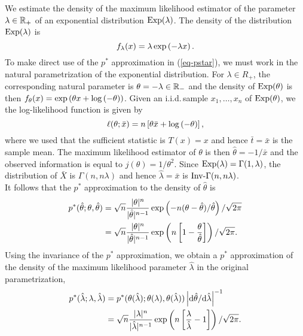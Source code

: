 \begin{example}
    We estimate the density of the maximum likelihood estimator of the parameter $\lambda \in \mathbb{R}_+$ of an exponential distribution ${\textrm{Exp}}(\lambda)$. The density of the distribution ${\textrm{Exp}}(\lambda)$ is
    \begin{equation*}
        f_\lambda(x) = \lambda \exp\left(-\lambda x\right).
    \end{equation*}
    To make direct use of the $p^*$ approximation in (\ref{eq-pstar}), we must work in the natural parametrization of the exponential distribution. For $\lambda \in R_+$, the corresponding natural parameter is $\theta = -\lambda \in \mathbb{R}_-$ and the density of ${\textrm{Exp}}(\theta)$ is then $f_\theta(x) = \exp\left( \theta x + \log\left(-\theta\right)\right)$. Given an i.i.d.\,sample $x_1, \ldots, x_n$ of ${\textrm{Exp}}(\theta)$, we the log-likelihood function is given by 
    \begin{equation*}
        \ell(\theta; \bar x) = n\left[\theta \bar x + \log\left(-\theta\right)\right],
    \end{equation*}
    where we used that the sufficient statistic is $T(x) = x$ and hence $\bar t = \bar x$ is the sample mean. The maximum likelihood estimator of $\theta$ is then $\hat\theta = -1/\bar x$ and the observed information is equal to $j(\theta) = 1/\theta^2$. Since ${\textrm{Exp}}(\lambda) = \Gamma(1, \lambda)$, the distribution of $\bar X$ is $\Gamma(n, n\lambda)$ and hence $\hat\lambda = \bar x$ is ${\textrm{Inv-}}\Gamma(n, n\lambda)$. 
    \\
    It follows that the $p^*$ approximation to the density of $\hat\theta$ is
    \begin{align*}
        p^*(\hat\theta; \theta, \hat\theta) 
        &= \sqrt{n} \frac{|\theta|^n}{|\hat\theta|^{n-1}}\exp\left(-n(\theta - \hat\theta)/\hat\theta\right) / \sqrt{2\pi}\\
        &= \sqrt{n} \frac{|\theta|^n}{|\hat\theta|^{n-1}}\exp\left(n\left[1 - \frac{\theta}{\hat\theta}\right]\right) / \sqrt{2\pi}.
    \end{align*}
    Using the invariance of the $p^*$ approximation, we obtain a $p^*$ approximation of the density of the maximum likelihood parameter $\hat\lambda$ in the original parametrization,
    \begin{align}
        p^*(\hat\lambda; \lambda, \hat\lambda) 
        &= p^*(\theta(\hat\lambda); \theta(\lambda), \theta(\hat\lambda)) \left|\text{d} \hat\theta / \text{d} \hat\lambda\right|^{-1} \nonumber\\
        &= \sqrt{n} \frac{|\lambda|^n}{|\hat\lambda|^{n-1}}\exp\left(n\left[\frac{\lambda}{\hat\lambda} - 1\right]\right) / \sqrt{2\pi}. \label{eq-pstar-lambda}
    \end{align}
    

\end{example}
